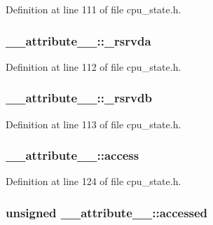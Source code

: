 \-Definition at line 111 of file cpu\-\_\-state.\-h.

\hypertarget{struct____attribute_____ab233f64306ede40d871ffebbb34cfb01}{
\subsubsection[{\-\_\-rsrvda}]{ {\bf \-\_\-\-\_\-attribute\-\_\-\-\_\-\-::\-\_\-rsrvda}}}\label{struct____attribute_____ab233f64306ede40d871ffebbb34cfb01}


\-Definition at line 112 of file cpu\-\_\-state.\-h.

\hypertarget{struct____attribute_____ab7e94defff3d6a4c6c5ee3e9e6fd4ec0}{
\subsubsection[{\-\_\-rsrvdb}]{ {\bf \-\_\-\-\_\-attribute\-\_\-\-\_\-\-::\-\_\-rsrvdb}}}\label{struct____attribute_____ab7e94defff3d6a4c6c5ee3e9e6fd4ec0}


\-Definition at line 113 of file cpu\-\_\-state.\-h.

\hypertarget{struct____attribute_____ad44da5c5d309990a24d982d84b66096f}{
\subsubsection[{access}]{ {\bf \-\_\-\-\_\-attribute\-\_\-\-\_\-\-::access}}}\label{struct____attribute_____ad44da5c5d309990a24d982d84b66096f}


\-Definition at line 124 of file cpu\-\_\-state.\-h.

\hypertarget{struct____attribute_____a43efc2e4e993f4b1d45366309f00d528}{
\subsubsection[{accessed}]{\setlength{\rightskip}{0pt plus 5cm}unsigned {\bf \-\_\-\-\_\-attribute\-\_\-\-\_\-\-::accessed}}}\label{struct____attribute_____a43efc2e4e993f4b1d45366309f00d528}


